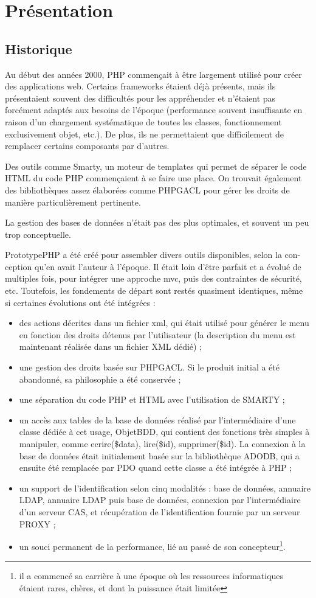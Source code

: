 \chapter{Présentation}
\section{Historique}
Au début des années 2000, PHP commençait à être largement utilisé pour créer des applications web. Certains frameworks étaient déjà présents, mais ils présentaient souvent des difficultés pour les appréhender et n'étaient pas forcément adaptés aux besoins de l'époque (performance souvent insuffisante en raison d'un chargement systématique de toutes les classes, fonctionnement exclusivement objet, etc.). De plus, ils ne permettaient que difficilement de remplacer certains composants par d'autres.

Des outils comme Smarty, un moteur de templates qui permet de séparer le code HTML du code PHP commençaient à se faire une place. On trouvait également des bibliothèques assez élaborées comme PHPGACL pour gérer les droits de manière particulièrement pertinente.

La gestion des bases de données n'était pas des plus optimales, et souvent un peu trop conceptuelle.

PrototypePHP a été créé pour assembler divers outils disponibles, selon la con-ception qu'en avait l'auteur à l'époque. Il était loin d'être parfait et a évolué de multiples fois, pour intégrer une approche mvc, puis des contraintes de sécurité, etc. Toutefois, les fondements de départ sont restés quasiment identiques, même si certaines évolutions ont été intégrées :
\begin{itemize}
\item des actions décrites dans un fichier xml, qui était utilisé pour générer le menu en fonction des droits détenus par l'utilisateur (la description du menu est maintenant réalisée dans un fichier XML dédié) ;
\item une gestion des droits basée sur PHPGACL. Si le produit initial a été abandonné, sa philosophie a été conservée ;
\item une séparation du code PHP et HTML avec l'utilisation de SMARTY ;
\item un accès aux tables de la base de données réalisé par l'intermédiaire d'une classe dédiée à cet usage, ObjetBDD, qui contient des fonctions très simples à manipuler, comme ecrire(\$data), lire(\$id), supprimer(\$id). La connexion à la base de données était initialement basée sur la bibliothèque ADODB, qui a ensuite été remplacée par PDO quand cette classe a été intégrée à PHP ;
\item un support de l'identification selon cinq modalités : base de données, annuaire LDAP, annuaire LDAP puis base de données, connexion par l'intermédiaire d'un serveur CAS, et récupération de l'identification fournie par un serveur PROXY  ;
\item un souci permanent de la performance, lié au passé de son concepteur\footnote{il a commencé sa carrière à une époque où les ressources informatiques étaient rares, chères, et dont la puissance était limitée}.
\end{itemize}

